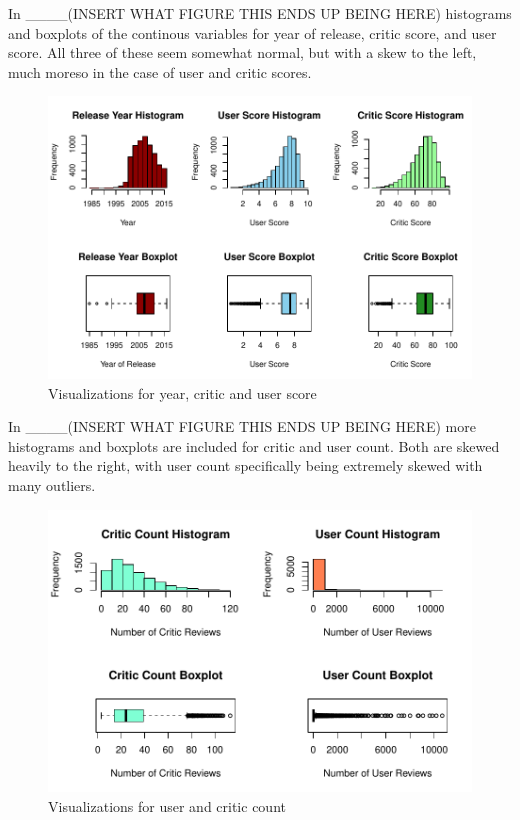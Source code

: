 \documentclass[12pt]{article}
\begin{document}
In ____(INSERT WHAT FIGURE THIS ENDS UP BEING HERE) histograms and boxplots of the continous variables for year of release, critic score, and user score.
All three of these seem somewhat normal, but with a skew to the left, much moreso in the case of user and critic scores.
\begin{figure}[tbp]
  \centering
  \includegraphics[width=\textwidth]{histandboxpt1.pdf}
  \caption{Visualizations for year, critic and user score}
  \label{fig:histandboxpt1}
\end{figure}

In ____(INSERT WHAT FIGURE THIS ENDS UP BEING HERE) more histograms and boxplots are included for critic and user count.
Both are skewed heavily to the right, with user count specifically being extremely skewed with many outliers.
\begin{figure}[tbp]
  \centering
  \includegraphics[width=\textwidth]{histandboxpt2.pdf}
  \caption{Visualizations for user and critic count}
  \label{fig:histandboxpt2}
\end{figure}
\end{document}
